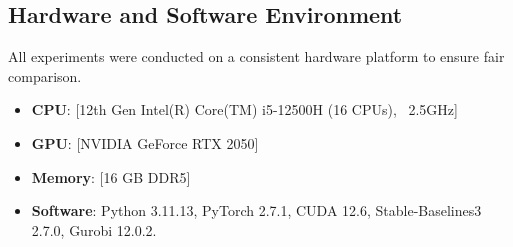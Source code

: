 \subsection{Hardware and Software Environment}
All experiments were conducted on a consistent hardware platform to ensure fair comparison.
\begin{itemize}
    \item \textbf{CPU}: [12th Gen Intel(R) Core(TM) i5-12500H (16 CPUs), ~2.5GHz]
    \item \textbf{GPU}: [NVIDIA GeForce RTX 2050]
    \item \textbf{Memory}: [16 GB DDR5]
    \item \textbf{Software}: Python 3.11.13, PyTorch 2.7.1, CUDA 12.6, Stable-Baselines3 2.7.0, Gurobi 12.0.2.
\end{itemize}